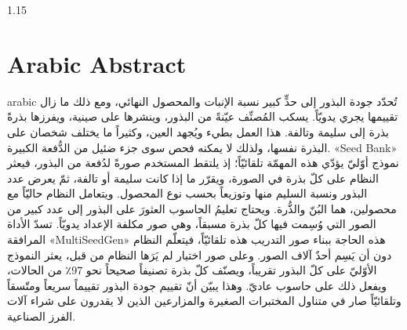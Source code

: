 \documentclass[12pt, a4paper]{report}
\begin{document}
\begin{spacing}{1.15}
\section*{Arabic Abstract}
\begin{otherlanguage*}{arabic}
تُحدّد جودة البذور إلى حدٍّ كبير نسبة الإنبات والمحصول النهائي، ومع ذلك ما زال
تقييمها يجري يدويّاً. يسكب المُصنِّف عيّنةً من البذور، وينشرها على صينية، ويفرزها
بذرةً بذرة إلى سليمة وتالفة. هذا العمل بطيء ويُجهد العين، وكثيراً ما يختلف شخصان
على البذرة نفسها، ولذلك لا يمكنه فحص سوى جزء ضئيل من الدُّفعة الكبيرة. «Seed Bank»
نموذج أوّليّ يؤدّي هذه المهمّة تلقائيّاً؛ إذ يلتقط المستخدم صورةً لدُفعة من البذور،
فيعثر النظام على كلّ بذرة في الصورة، ويقرّر ما إذا كانت سليمة أو تالفة، ثمّ يعرض
عدد البذور ونسبة السليم منها وتوزيعاً بحسب نوع المحصول. ويتعامل النظام حاليّاً مع
محصولين، هما البُنّ والذُّرة. ويحتاج تعليمُ الحاسوب العثورَ على البذور إلى عدد كبير
من الصور التي وُسِمت فيها كلّ بذرة مسبقاً، وهي صور مكلفة الإعداد يدويّاً. تسدّ
الأداة المرافقة «MultiSeedGen» هذه الحاجة ببناء صور التدريب هذه تلقائيّاً، فيتعلّم
النظام دون أن يَسِم أحدٌ آلاف الصور. وعلى صور اختبار لم يَرَها النظام من قبل، يعثر
النموذج الأوّليّ على كلّ البذور تقريباً، ويصنّف كلّ بذرة تصنيفاً صحيحاً نحو 97٪ من
الحالات، ويفعل ذلك على حاسوب عاديّ. وهذا يبيّن أنّ تقييم جودة البذور تقييماً سريعاً
ومتّسقاً وتلقائيّاً صار في متناول المختبرات الصغيرة والمزارعين الذين لا يقدرون على
شراء آلات الفرز الصناعية.
\end{otherlanguage*}
\end{spacing}
\newpage










\printbibliography[heading=bibintoc, title={References}]
\end{document}
